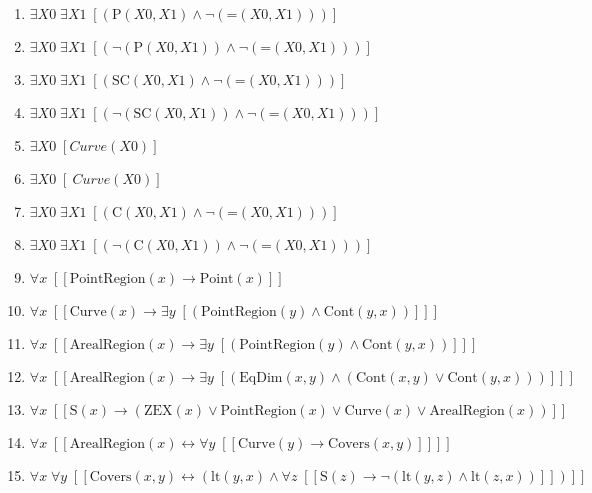 \documentclass{article}
\begin{document}
\begin{enumerate}
\item $\exists X0\; \exists X1\;  \left[ \left(\textrm{P}(X0,X1) \land \neg \left(\textrm{=}(X0,X1)\right)\right) \right]$
\item $\exists X0\; \exists X1\;  \left[ \left(\neg \left(\textrm{P}(X0,X1)\right) \land \neg \left(\textrm{=}(X0,X1)\right)\right) \right]$
\item $\exists X0\; \exists X1\;  \left[ \left(\textrm{SC}(X0,X1) \land \neg \left(\textrm{=}(X0,X1)\right)\right) \right]$
\item $\exists X0\; \exists X1\;  \left[ \left(\neg \left(\textrm{SC}(X0,X1)\right) \land \neg \left(\textrm{=}(X0,X1)\right)\right) \right]$
\item $\exists X0\;  \left[ Curve(X0) \right]$
\item $\exists X0\;  \left[ ~Curve(X0) \right]$
\item $\exists X0\; \exists X1\;  \left[ \left(\textrm{C}(X0,X1) \land \neg \left(\textrm{=}(X0,X1)\right)\right) \right]$
\item $\exists X0\; \exists X1\;  \left[ \left(\neg \left(\textrm{C}(X0,X1)\right) \land \neg \left(\textrm{=}(X0,X1)\right)\right) \right]$
\item $\forall x\;  \left[ \left[ \textrm{PointRegion}(x) \rightarrow \textrm{Point}(x) \right] \right]$
\item $\forall x\;  \left[ \left[ \textrm{Curve}(x) \rightarrow \exists y\;  \left[ \left(\textrm{PointRegion}(y) \land \textrm{Cont}(y,x)\right) \right] \right] \right]$
\item $\forall x\;  \left[ \left[ \textrm{ArealRegion}(x) \rightarrow \exists y\;  \left[ \left(\textrm{PointRegion}(y) \land \textrm{Cont}(y,x)\right) \right] \right] \right]$
\item $\forall x\;  \left[ \left[ \textrm{ArealRegion}(x) \rightarrow \exists y\;  \left[ \left(\textrm{EqDim}(x,y) \land \left(\textrm{Cont}(x,y) \lor \textrm{Cont}(y,x)\right)\right) \right] \right] \right]$
\item $\forall x\;  \left[ \left[ \textrm{S}(x) \rightarrow \left(\textrm{ZEX}(x) \lor \textrm{PointRegion}(x) \lor \textrm{Curve}(x) \lor \textrm{ArealRegion}(x)\right) \right] \right]$
\item $\forall x\;  \left[ \left[ \textrm{ArealRegion}(x) \leftrightarrow \forall y\;  \left[ \left[ \textrm{Curve}(y) \rightarrow \textrm{Covers}(x,y) \right] \right] \right] \right]$
\item $\forall x\; \forall y\;  \left[ \left[ \textrm{Covers}(x,y) \leftrightarrow \left(\textrm{lt}(y,x) \land \forall z\;  \left[ \left[ \textrm{S}(z) \rightarrow \neg \left(\textrm{lt}(y,z) \land \textrm{lt}(z,x)\right) \right] \right]\right) \right] \right]$

\end{enumerate}
\end{document}
